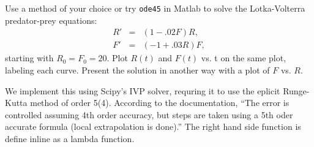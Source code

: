 \documentclass[10pt]{article}
\begin{document}
\begin{problem}[Problem 6]
Use a method of your choice or try \verb+ode45+ in Matlab to solve the Lotka-Volterra predator-prey
equations:
\begin{eqnarray*}
R' & = & (1 - .02F) R , \\
F' & = & (-1 + .03R) F ,
\end{eqnarray*}
starting with \( R_0 = F_0 = 20 \).  Plot \( R(t) \) and \( F(t) \) vs. t on the same plot, labeling each curve.
Present the solution in another way with a plot of \( F \) vs. \( R \).
\end{problem}

\begin{solution}[Solution]

We implement this using Scipy's IVP solver, requring it to use the eplicit Runge-Kutta method of order 5(4). According to the documentation, ``The error is controlled assuming 4th order accuracy, but steps are taken using a 5th oder accurate formula (local extrapolation is done).'' The right hand side function is define inline as a lambda function.



\end{solution}
\end{document}
